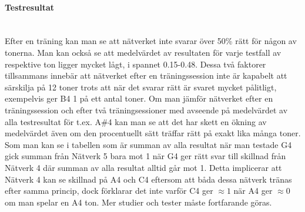 \documentclass[a4paper,10pt]{article}
\begin{document}
\begin{center}
\end{center}

\paragraph{Testresultat}\hspace{0pt}\\
Efter en träning kan man se att nätverket inte svarar över 50\% rätt för någon av tonerna. Man kan också se att medelvärdet av resultaten för varje testfall av respektive ton ligger mycket lågt, i spannet 0.15-0.48. Dessa två faktorer tillsammans innebär att nätverket efter en träningssession inte är kapabelt att särskilja på 12 toner trots att när det svarar rätt är svaret mycket pålitligt, exempelvis ger B4 1 på ett antal toner. 
Om man jämför nätverket efter en träningssession och efter två träningsessioner med avseende på medelvärdet av alla testresultat för t.ex. A\#4 kan man se att det har skett en ökning av medelvärdet även om den procentuellt sätt träffar rätt på exakt lika många toner. Som man kan se i tabellen som är summan av alla resultat när man testade G4 gick summan från Nätverk 5 bara mot 1 när G4 ger rätt svar till skillnad från Nätverk 4 där summan av alla resultat alltid går mot 1. Detta implicerar att Nätverk 4 kan se skillnad på A4 och C4 eftersom att båda dessa nätverk tränas efter samma princip, dock förklarar det inte varför C4 ger $\approx 1$ när A4 ger $\approx 0$ om man spelar en A4 ton. Mer studier och tester måste fortfarande göras.
\end{document}
